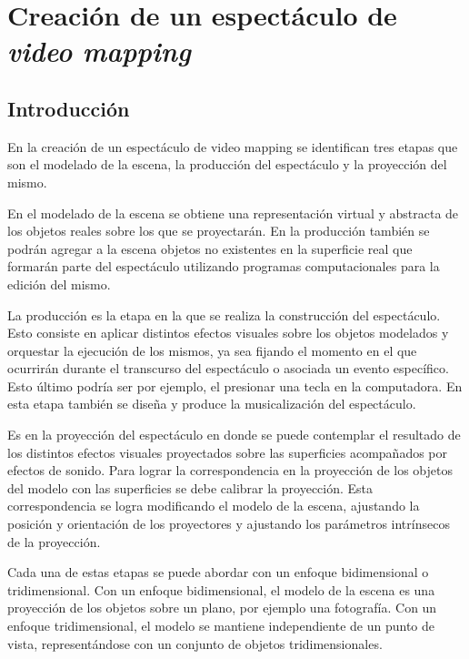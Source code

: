 \chapter{Creación de un espectáculo de \emph{video mapping}}

\section{Introducción}
En la creación de un espectáculo de video mapping se identifican tres etapas que son el modelado de la escena, la producción del espectáculo y la proyección del mismo.

En el modelado de la escena se obtiene una representación virtual y abstracta de los objetos reales sobre los que se proyectarán. En la producción también se podrán agregar a la escena objetos no existentes en la superficie real que formarán parte del espectáculo utilizando programas computacionales para la edición del mismo.

La producción es la etapa en la que se realiza la construcción del espectáculo. Esto consiste en aplicar distintos efectos visuales sobre los objetos modelados y orquestar la ejecución de los mismos, ya sea fijando el momento en el que ocurrirán durante el transcurso del espectáculo o asociada un evento específico. Esto último podría ser por ejemplo, el presionar una tecla en la computadora.
En esta etapa también se diseña y produce la musicalización del espectáculo.

Es en la proyección del espectáculo en donde se puede contemplar el resultado de los distintos efectos visuales proyectados sobre las superficies acompañados por efectos de sonido.
Para lograr la correspondencia en la proyección de los objetos del modelo con las superficies se debe calibrar la proyección. Esta correspondencia se logra modificando el modelo de la escena, ajustando la posición y orientación de los proyectores y ajustando los parámetros intrínsecos de la proyección.

Cada una de estas etapas se puede abordar con un enfoque bidimensional o tridimensional.
Con un enfoque bidimensional, el modelo de la escena es una proyección de los objetos sobre un plano, por ejemplo una fotografía. Con un enfoque tridimensional, el modelo se mantiene independiente de un punto de vista, representándose con un conjunto de objetos tridimensionales.

